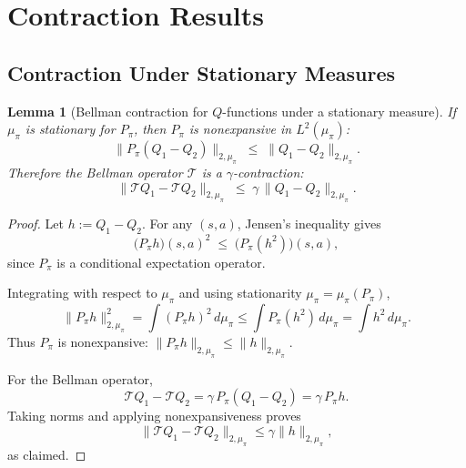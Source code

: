 \documentclass{article}
\theoremstyle{plain}
\newtheorem{lemma}{Lemma}
\theoremstyle{definition}
\theoremstyle{remark}
\begin{document}
\section{Contraction Results}

\label{appendix::stationary}

 


\subsection{Contraction Under Stationary Measures}

 

\begin{lemma}[Bellman contraction for $Q$-functions under a stationary measure]
\label{lemma::Qcontraction}
If ${\mu_\pi}$ is stationary for $P_\pi$, then $P_\pi$ is nonexpansive in $L^2({\mu_\pi})$:
\[
\|P_\pi(Q_1 - Q_2)\|_{2,{\mu_\pi}}
\;\le\;
\|Q_1 - Q_2\|_{2,{\mu_\pi}}.
\]
Therefore the Bellman operator $\mathcal{T}$ is a $\gamma$-contraction:
\[
\|\mathcal{T}Q_1 - \mathcal{T}Q_2\|_{2,{\mu_\pi}}
\;\le\;
\gamma\,\|Q_1 - Q_2\|_{2,{\mu_\pi}}.
\]
\end{lemma}

\begin{proof}
Let $h := Q_1 - Q_2$.  
For any $(s,a)$, Jensen's inequality gives
\[
\bigl(P_\pi h\bigr)(s,a)^2
\;\le\;
\bigl(P_\pi(h^2)\bigr)(s,a),
\]
since $P_\pi$ is a conditional expectation operator.

Integrating with respect to ${\mu_\pi}$ and using stationarity
${\mu_\pi} = {\mu_\pi}(P_\pi)$,
\[
\|P_\pi h\|_{2,{\mu_\pi}}^2
= \int (P_\pi h)^2 \, d{\mu_\pi}
\le \int P_\pi(h^2)\, d{\mu_\pi}
= \int h^2\, d{\mu_\pi}.
\]
Thus $P_\pi$ is nonexpansive:
\(
\|P_\pi h\|_{2,{\mu_\pi}} \le \|h\|_{2,{\mu_\pi}}.
\)

For the Bellman operator,
\[
\mathcal{T}Q_1 - \mathcal{T}Q_2
= \gamma\, P_\pi(Q_1 - Q_2)
= \gamma\, P_\pi h.
\]
Taking norms and applying nonexpansiveness proves
\[
\|\mathcal{T}Q_1 - \mathcal{T}Q_2\|_{2,{\mu_\pi}}
\le \gamma \|h\|_{2,{\mu_\pi}},
\]
as claimed.
\end{proof}

 
\end{document}
